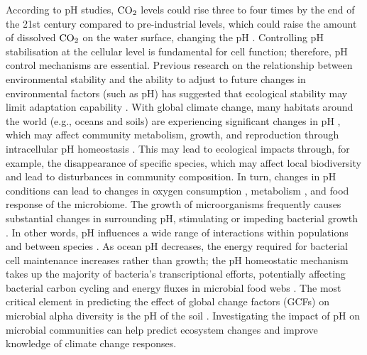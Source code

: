 \documentclass[11pt, a4paper]{article}
\begin{document}
\begin{spacing}{1.5}
According to pH studies, ${\rm CO_{2}}$ levels could rise three to four times by the end of the 21st century compared to pre-industrial levels, which could raise the amount of dissolved ${\rm CO_{2}}$ on the water surface, changing the pH \citep{orr2005anthropogenic}. Controlling pH stabilisation at the cellular level is fundamental for cell function; therefore, pH control mechanisms are essential. Previous research on the relationship between environmental stability and the ability to adjust to future changes in environmental factors (such as pH) has suggested that ecological stability may limit adaptation capability \citep{somero2012physiology}. With global climate change, many habitats around the world (e.g., oceans and soils) are experiencing significant changes in pH \citep{caldeira2003anthropogenic, cavicchioli2019scientists}, which may affect community metabolism, growth, and reproduction through intracellular pH homeostasis \citep{melzner2009physiological}. This may lead to ecological impacts through, for example, the disappearance of specific species, which may affect local biodiversity and lead to disturbances in community composition. In turn, changes in pH conditions can lead to changes in oxygen consumption \citep{bunse2016response}, metabolism \citep{arnosti2011dynamics, grossart2006testing}, and food response \citep{piontek2010acidification} of the microbiome. The growth of microorganisms frequently causes substantial changes in surrounding pH, stimulating or impeding bacterial growth \citep{collins1987transfer, fu1999lactic, sole2000rapid}. In other words, pH influences a wide range of interactions within populations and between species \citep{ratzke2018modifying}. As ocean pH decreases, the energy required for bacterial cell maintenance increases rather than growth; the pH homeostatic mechanism takes up the majority of bacteria's transcriptional efforts, potentially affecting bacterial carbon cycling and energy fluxes in microbial food webs \citep{bunse2016response}. The most critical element in predicting the effect of global change factors (GCFs) on microbial alpha diversity is the pH of the soil \citep{zhou2020meta}. Investigating the impact of pH on microbial communities can help predict ecosystem changes and improve knowledge of climate change responses.


\end{spacing}
\end{document}
